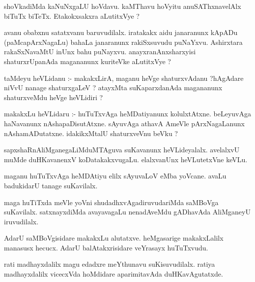 \documentclass{article}
\begin{document}
\begin{mn}
shoVkadiMda  kaNuNxgaLU  hoVdavu.  kaMThavu  hoVyitu  anuSAThxnavelAlx  biTuTx biTeTx.  Etakokxsakxra  aLutitxVye ?
\end{mn}

\begin{mn}
avanu  obabxnu  satatxvanu  baruvudilalx.  iratakakx  aidu  janaranunx  kApADu (paMcapArxNagaLu) 
bahaLa  janaranunx  rakiSxsuvudu  puNaYxvu.  Ashirxtara  rakaSxNavaMtU  inUnx  bahu  puNayxvu.  
anayxranAnxsharxyisi  shaturxrUpanAda  magananunx  kuriteVke  aLutitxVye ?
\end{mn}

\begin{mn}
taMdeyu  heVLidanu :- makakxLirA,  maganu  heVge  shaturxvAdanu ?hAgAdare  niVvU  nanage  shaturxgaLeV ?  
atayxMta  suKaparxdanAda  magananunx  shaturxveMdu  heVge  heVLidiri ?
\end{mn}

\begin{mn}
makakxLu  heVLidaru :- huTuTxvAga  heMDatiyanunx  kolulxtAtxne.  beLeyuvAga  haNavanunx  nAshapaDisutAtxne.  
sAyuvAga  athavA  AmeVle  pArxNagaLanunx  nAshamADutatxne.  idakikxMtalU  shaturxveVnu  beVku ?
\end{mn}

\begin{mn}
sapxshaRnAliMganegaLiMduMTAguva  suKavanunx  heVLideyalalx.  avelalxvU  muMde  duHKavanenxV  
koDatakakxvugaLu.  elalxvanUnx  heVLutetxVne  keVLu.
\end{mn}

\begin{mn}
maganu  huTuTxvAga  heMDAtiyu  elilx  sAyuvaLoV  eMba  yoVcane.  avaLu  badukidarU  tanage  suKavilalx.
\end{mn}

\begin{mn}
maga  huTiTxda  meVle  yoVni  shudadhxvAgadiruvudariMda  saMBoVga  suKavilalx.  satxnayxdiMda  avayavagaLu  
nenadAveMdu  gADhavAda  AliMganeyU  iruvudilalx.
\end{mn}

\begin{mn}
AdarU  saMBoVgisidare  makakxLu  alutatxve.  heMgasarige  makakxLalilx  manasusx  hecucx.  AdarU  
balAtakxrisidare  veYrasayx  huTuTxvudu.
\end{mn}

\begin{mn}
rati madhayxdalilx  magu  edadxre  meYthunavu  suKisuvudilalx.  ratiya  madhayxdalilx  vicecxVda 
hoMdidare  aparimitavAda  duHKavAgutatxde.
\end{mn}
\end{document}

